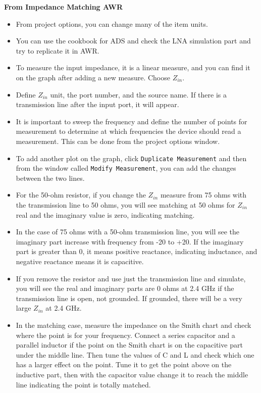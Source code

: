 \documentclass{article}
\begin{document}
\textbf{From Impedance Matching AWR}
\begin{itemize}
    \item From project options, you can change many of the item units.
    \item You can use the cookbook for ADS and check the LNA simulation part and try to replicate it in AWR.
    \item To measure the input impedance, it is a linear measure, and you can find it on the graph after adding a new measure. Choose \( Z_{in} \).
    \item Define \( Z_{in} \) unit, the port number, and the source name. If there is a transmission line after the input port, it will appear.
    \item It is important to sweep the frequency and define the number of points for measurement to determine at which frequencies the device should read a measurement. This can be done from the project options window.
    \item To add another plot on the graph, click \texttt{Duplicate Measurement} and then from the window called \texttt{Modify Measurement}, you can add the changes between the two lines.
    \item For the 50-ohm resistor, if you change the \( Z_{in} \) measure from 75 ohms with the transmission line to 50 ohms, you will see matching at 50 ohms for \( Z_{in} \) real and the imaginary value is zero, indicating matching.
    \item In the case of 75 ohms with a 50-ohm transmission line, you will see the imaginary part increase with frequency from -20 to +20. If the imaginary part is greater than 0, it means positive reactance, indicating inductance, and negative reactance means it is capacitive.
    \item If you remove the resistor and use just the transmission line and simulate, you will see the real and imaginary parts are 0 ohms at 2.4 GHz if the transmission line is open, not grounded. If grounded, there will be a very large \( Z_{in} \) at 2.4 GHz.
    \item In the matching case, measure the impedance on the Smith chart and check where the point is for your frequency. Connect a series capacitor and a parallel inductor if the point on the Smith chart is on the capacitive part under the middle line. Then tune the values of C and L and check which one has a larger effect on the point. Tune it to get the point above on the inductive part, then with the capacitor value change it to reach the middle line indicating the point is totally matched.

\end{itemize}
\end{document}
